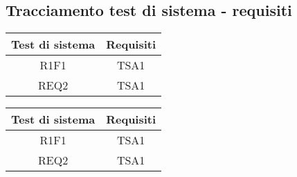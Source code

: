 \subsection{Tracciamento test di sistema - requisiti}

\begin{center}
	\begin{longtable}{|c|c|}
	\hline
	\rowcolor{lighter-grayer}
	\textbf{Test di sistema} & \textbf{Requisiti} \\
	\hline
	\endfirsthead



	\hline
	R1F1 & TSA1  \\
	REQ2 & TSA1 \\
	
	\hline
	
	

	\hline

	\end{longtable}
\end{center}

\begin{center}
	\begin{longtable}{|c|c|}
	\hline
	\rowcolor{lighter-grayer}
	\textbf{Test di sistema} & \textbf{Requisiti} \\
	\hline
	\endfirsthead


	
	
	R1F1 & TSA1  \\
	REQ2 & TSA1 \\

	\hline

	\end{longtable}
\end{center}



